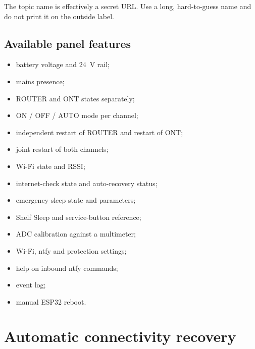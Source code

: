 \documentclass[11pt,a4paper]{article}
\begin{document}
\begin{tcolorbox}[colback=lightaccent,colframe=accent,title=ntfy security]
The topic name is effectively a secret URL. Use a long, hard-to-guess name and do not print it on the outside label.
\end{tcolorbox}

\subsection{Available panel features}
\begin{itemize}[leftmargin=7mm]
  \item battery voltage and 24~V rail;
  \item mains presence;
  \item ROUTER and ONT states separately;
  \item ON / OFF / AUTO mode per channel;
  \item independent restart of ROUTER and restart of ONT;
  \item joint restart of both channels;
  \item Wi-Fi state and RSSI;
  \item internet-check state and auto-recovery status;
  \item emergency-sleep state and parameters;
  \item Shelf Sleep and service-button reference;
  \item ADC calibration against a multimeter;
  \item Wi-Fi, ntfy and protection settings;
  \item help on inbound ntfy commands;
  \item event log;
  \item manual ESP32 reboot.
\end{itemize}

\section{Automatic connectivity recovery}
\end{document}
